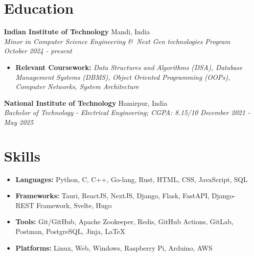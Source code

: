 \documentclass[7pt, legalpaper]{article}
\begin{document}
\section{Education}
\textbf{Indian Institute of Technology}  \hfill {Mandi, India}  \\
    \textit{{Minor in Computer Science Engineering \&\ Next Gen technologies Program} \hfill {October 2024 - present}}
  \begin{itemize}[leftmargin=*,label=$\diamond$]
    \item \small \textbf{Relevant Coursework:} \textit{Data Structures and Algorithms (DSA), Database Management Systems (DBMS), Object Oriented Programming (OOPs),  Computer Networks, System Architecture}
\end{itemize}
 \textbf{National Institute of Technology}  \hfill {Hamirpur, India}  \\
    \textit{{Bachelor of Technology - Electrical Engineering; CGPA: 8.15/10} \hfill {December 2021 - May 2025}}

\section{Skills}
\begin{itemize}[leftmargin=*]
    \item \textbf{Languages:} Python, C, C++, Go-lang, Rust, HTML, CSS, JavaScript, SQL
    \item \textbf{Frameworks:} Tauri, ReactJS, NextJS, Django, Flask, FastAPI, Django-REST Framework, Svelte, Hugo
    \item \textbf{Tools:} Git/GitHub, Apache Zookeeper, Redis, GitHub Actions, GitLab, Postman, PostgreSQL, Jinja, LaTeX
    \item \textbf{Platforms:} Linux, Web, Windows, Raspberry Pi, Arduino, AWS
\end{itemize}
\end{document}
